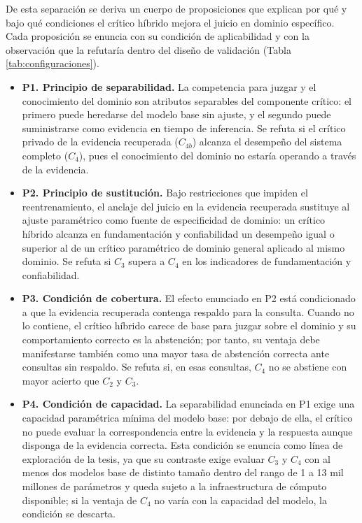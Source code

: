 De esta separación se deriva un cuerpo de proposiciones que explican por qué y bajo qué condiciones el crítico híbrido mejora el juicio en dominio específico. Cada proposición se enuncia con su condición de aplicabilidad y con la observación que la refutaría dentro del diseño de validación (Tabla \ref{tab:configuraciones}).

\begin{itemize}
	\item \textbf{P1. Principio de separabilidad.} La competencia para juzgar y el conocimiento del dominio son atributos separables del componente crítico: el primero puede heredarse del modelo base sin ajuste, y el segundo puede suministrarse como evidencia en tiempo de inferencia. Se refuta si el crítico privado de la evidencia recuperada ($C_{4b}$) alcanza el desempeño del sistema completo ($C_4$), pues el conocimiento del dominio no estaría operando a través de la evidencia.
	\item \textbf{P2. Principio de sustitución.} Bajo restricciones que impiden el reentrenamiento, el anclaje del juicio en la evidencia recuperada sustituye al ajuste paramétrico como fuente de especificidad de dominio: un crítico híbrido alcanza en fundamentación y confiabilidad un desempeño igual o superior al de un crítico paramétrico de dominio general aplicado al mismo dominio. Se refuta si $C_3$ supera a $C_4$ en los indicadores de fundamentación y confiabilidad.
	\item \textbf{P3. Condición de cobertura.} El efecto enunciado en P2 está condicionado a que la evidencia recuperada contenga respaldo para la consulta. Cuando no lo contiene, el crítico híbrido carece de base para juzgar sobre el dominio y su comportamiento correcto es la abstención; por tanto, su ventaja debe manifestarse también como una mayor tasa de abstención correcta ante consultas sin respaldo. Se refuta si, en esas consultas, $C_4$ no se abstiene con mayor acierto que $C_2$ y $C_3$.
	\item \textbf{P4. Condición de capacidad.} La separabilidad enunciada en P1 exige una capacidad paramétrica mínima del modelo base: por debajo de ella, el crítico no puede evaluar la correspondencia entre la evidencia y la respuesta aunque disponga de la evidencia correcta. Esta condición se enuncia como línea de exploración de la tesis, ya que su contraste exige evaluar $C_3$ y $C_4$ con al menos dos modelos base de distinto tamaño dentro del rango de 1 a 13 mil millones de parámetros y queda sujeto a la infraestructura de cómputo disponible; si la ventaja de $C_4$ no varía con la capacidad del modelo, la condición se descarta.
\end{itemize}

